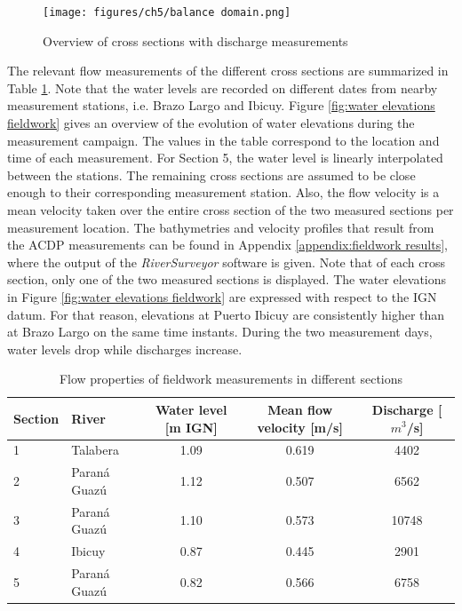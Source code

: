 \begin{figure}[H]
    \centering
    \texttt{[image: figures/ch5/balance domain.png]}
    \caption{Overview of cross sections with discharge measurements}
    \label{fig:cross section domain}
\end{figure}

The relevant flow measurements of the different cross sections are summarized in Table \ref{tab:discharges fieldwork}. Note that the water levels are recorded on different dates from nearby measurement stations, i.e. Brazo Largo and Ibicuy. Figure \ref{fig:water elevations fieldwork} gives an overview of the evolution of water elevations during the measurement campaign. The values in the table correspond to the location and time of each measurement. For Section 5, the water level is linearly interpolated between the stations. The remaining cross sections are assumed to be close enough to their corresponding measurement station.  Also, the flow velocity is a mean velocity taken over the entire cross section of the two measured sections per measurement location. The bathymetries and velocity profiles that result from the ACDP measurements can be found in Appendix \ref{appendix:fieldwork results}, where the output of the \textit{RiverSurveyor} software is given. Note that of each cross section, only one of the two measured sections is displayed. The water elevations in Figure \ref{fig:water elevations fieldwork} are expressed with respect to the IGN datum. For that reason, elevations at Puerto Ibicuy are consistently higher than at Brazo Largo on the same time instants. During the two measurement days, water levels drop while discharges increase.

\begin{table}[H]
    \centering
    \renewcommand{\arraystretch}{1.2} %
    \setlength{\tabcolsep}{8pt}       %
    \caption{Flow properties of fieldwork measurements in different sections}
    \begin{tabular}{llccc}
        \toprule
        Section & River & Water level [m IGN] & Mean flow velocity [m/s] & Discharge [$m^3$/s] \\
        \midrule
        1 & Talabera       & 1.09 & 0.619 & 4402 \\
        2 & Paraná Guazú   & 1.12 & 0.507 & 6562 \\
        3 & Paraná Guazú   & 1.10 & 0.573 & 10748 \\
        \midrule
        4 & Ibicuy & 0.87 & 0.445 & 2901 \\
        5 & Paraná Guazú   & 0.82 & 0.566 & 6758 \\
        \bottomrule
    \end{tabular}
    \label{tab:discharges fieldwork}
\end{table}

